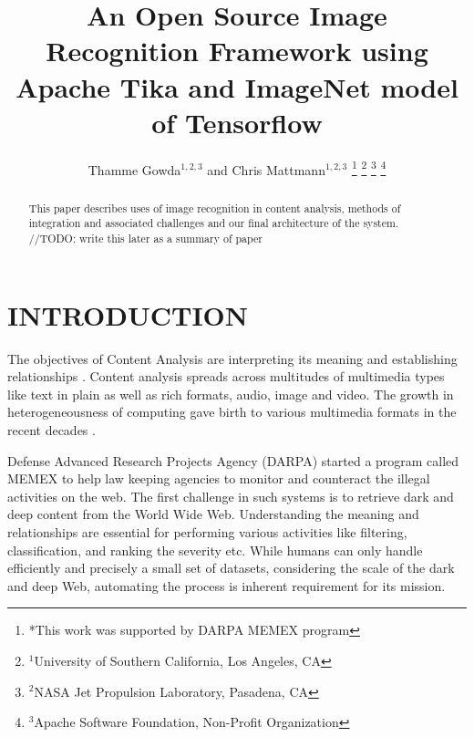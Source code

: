 \documentclass[letterpaper, 10 pt, conference]{ieeeconf}  %
\title{\bf An Open Source Image Recognition Framework using Apache Tika and ImageNet model of Tensorflow}
\author{Thamme Gowda$^{1,2,3}$ and Chris Mattmann$^{1,2,3}$%
\thanks{*This work was supported by DARPA MEMEX program}%
\thanks{$^{1}$University of Southern California, Los Angeles, CA }%
\thanks{$^{2}$NASA Jet Propulsion Laboratory, Pasadena, CA }%
\thanks{$^{3}$Apache Software Foundation, Non-Profit Organization}%
}
\begin{document}
\maketitle
\thispagestyle{empty}
\pagestyle{empty}


\begin{abstract}
This paper describes uses of image recognition in content analysis, methods of integration and associated challenges and our final architecture of the system. //TODO: write this later as a summary of paper
\end{abstract}


\section{INTRODUCTION}
The objectives of Content Analysis are interpreting its meaning and establishing relationships \cite{}. Content analysis spreads across multitudes of multimedia types like text in plain as well as rich formats, audio, image and video. The growth in heterogeneousness of computing gave birth to various multimedia formats in the recent decades \cite{}.  

Defense Advanced Research Projects Agency (DARPA) started a program called MEMEX\cite{} to help law keeping agencies to monitor and counteract the illegal activities on the web. The first challenge in such systems is to retrieve dark and deep content from the World Wide Web. Understanding the meaning and relationships are essential for performing various activities like filtering, classification, and ranking the severity etc. While humans can only handle efficiently and precisely a small set of datasets, considering the scale of the dark and deep Web, automating the process is inherent requirement for its mission.
\end{document}
